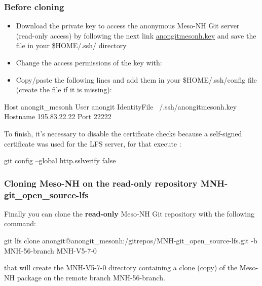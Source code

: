 \subsubsection{Before cloning}

\begin{itemize}
\item Download the private key to access the anonymous Meso-NH Git server (read-only access) by following the next link \href{http://mesonh.aero.obs-mip.fr/mesonh56/GitSources?action=AttachFile&do=get&target=anongitmesonh.key}{anongitmesonh.key} and save the file in your \$HOME/.ssh/ directory
\item Change the access permissions of the key with:
\end{itemize}
\begin{itemize}
\item Copy/paste the following lines and add them in your \$HOME/.ssh/config file (create the file if it is missing):
\end{itemize}
\begin{bashcode}
Host anongit_mesonh
  User anongit
  IdentityFile ~/.ssh/anongitmesonh.key
  Hostname 195.83.22.22
  Port 22222
\end{bashcode}

To finish, it's necessary to disable the certificate checks because a self-signed certificate was used for the LFS server, for that execute :
\begin{bashcode}
git config --global http.sslverify false
\end{bashcode}

\subsubsection{Cloning Meso-NH on the read-only repository MNH-git\_open\_source-lfs}

Finally you can clone the \textbf{read-only} Meso-NH Git repository with the following command:
\begin{bashcode}
git lfs clone anongit@anongit_mesonh:/gitrepos/MNH-git_open_source-lfs.git -b MNH-56-branch MNH-V5-7-0
\end{bashcode}

that will create the MNH-V5-7-0 directory containing a clone (copy) of the Meso-NH package on the remote branch MNH-56-branch.

